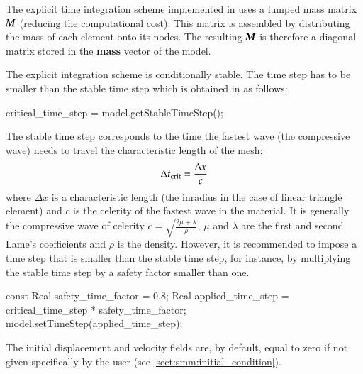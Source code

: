 The explicit time integration scheme implemented in \akantu uses a
lumped mass matrix $\boldsymbol{M}$ (reducing the computational cost). This
matrix is assembled by distributing the mass of each element onto its
nodes. The resulting $\boldsymbol{M}$ is therefore a diagonal matrix stored
in the \textbf{mass} vector of the model.

The explicit integration scheme is conditionally stable. The time step
has to be smaller than the stable time step which is obtained in
\akantu as follows:

\begin{cpp}
critical_time_step = model.getStableTimeStep();
\end{cpp} 

The stable time  step corresponds to the time the fastest wave (the compressive
wave) needs to travel the characteristic length of the mesh:
\begin{equation}
\label{eqn:smm:explicit:stabletime}
\Delta t_{{\mathrm{crit}}} = \frac{\Delta x}{c}
\end{equation}
where $\Delta x$ is a characteristic length (\eg the inradius in the
case of linear triangle element) and $c$ is the celerity of the fastest wave in the material. It is generally the compressive
wave of celerity $c = \sqrt{\frac{2 \mu + \lambda}{\rho}}$, $\mu$ and $\lambda$ are the first and second Lame's coefficients and $\rho$ is the density. However, it is recommended to impose a time step that is smaller than the stable time step, for
instance, by multiplying the stable time step by a safety factor smaller than one.

\begin{cpp}
const Real safety_time_factor = 0.8;
Real applied_time_step = critical_time_step * safety_time_factor;
model.setTimeStep(applied_time_step);
\end{cpp}
 The initial displacement and
velocity fields are, by default, equal to zero if not given
specifically by the user (see \ref{sect:smm:initial_condition}).

